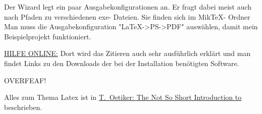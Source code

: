 Der Wizard legt ein paar Ausgabekonfigurationen an. Er fragt dabei meist auch nach Pfaden zu verschiedenen exe- Dateien. Sie finden sich im MikTeX- Ordner 
Man muss die Ausgabekonfiguration "LaTeX->PS->PDF" auswählen, damit mein Beispielprojekt funktioniert. 

\hyperlink {https://latex.tugraz.at/}{HILFE ONLINE:}
Dort wird das Zitieren auch sehr ausführlich erklärt und man findet Links zu den Downloads der bei der Installation benötigten Software.

OVERFEAF!




Alles zum Thema Latex ist in
\href{https://tobi.oetiker.ch/lshort/lshort.pdf}{T.~Oetiker: The Not So Short Introduction to \LaTeXe}
beschrieben.
